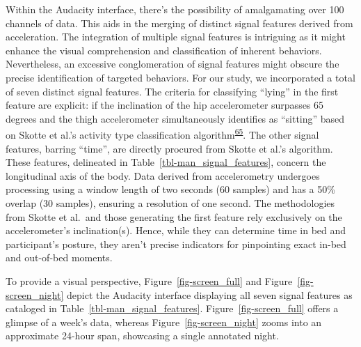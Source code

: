 \documentclass[
  10pt,
]{scrbook}
\begin{document}
Within the Audacity interface, there's the possibility of amalgamating
over 100 channels of data. This aids in the merging of distinct signal
features derived from acceleration. The integration of multiple signal
features is intriguing as it might enhance the visual comprehension and
classification of inherent behaviors. Nevertheless, an excessive
conglomeration of signal features might obscure the precise
identification of targeted behaviors. For our study, we incorporated a
total of seven distinct signal features. The criteria for classifying
``lying'' in the first feature are explicit: if the inclination of the
hip accelerometer surpasses 65 degrees and the thigh accelerometer
simultaneously identifies as ``sitting'' based on Skotte et al.'s
activity type classification
algorithm\textsuperscript{\protect\hyperlink{ref-skotte_detection_2014}{65}}.
The other signal features, barring ``time'', are directly procured from
Skotte et al.'s algorithm. These features, delineated in
Table~\ref{tbl-man_signal_features}, concern the longitudinal axis of
the body. Data derived from accelerometry undergoes processing using a
window length of two seconds (60 samples) and has a 50\% overlap (30
samples), ensuring a resolution of one second. The methodologies from
Skotte et al.~and those generating the first feature rely exclusively on
the accelerometer's inclination(s). Hence, while they can determine time
in bed and participant's posture, they aren't precise indicators for
pinpointing exact in-bed and out-of-bed moments.

To provide a visual perspective, Figure~\ref{fig-screen_full} and
Figure~\ref{fig-screen_night} depict the Audacity interface displaying
all seven signal features as cataloged in
Table~\ref{tbl-man_signal_features}. Figure~\ref{fig-screen_full} offers
a glimpse of a week's data, whereas Figure~\ref{fig-screen_night} zooms
into an approximate 24-hour span, showcasing a single annotated night.

\begingroup

\footnotesize
\end{document}
